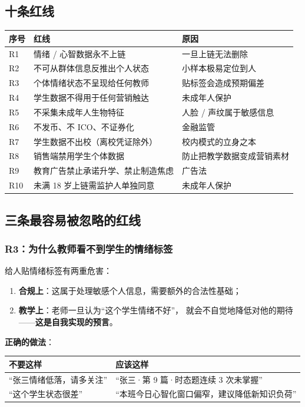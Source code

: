 \documentclass[UTF8,a4paper,11pt]{ctexart}
\newcommand{\hl}[1]{\textcolor{blue!70!black}{\textbf{#1}}}
\newcommand{\warn}[1]{\textcolor{red!70!black}{\textbf{#1}}}
\begin{document}
\subsection{十条红线}

\begin{longtable}{@{}p{1.0cm}p{6.6cm}p{6.0cm}@{}}
\toprule
\textbf{序号} & \textbf{红线} & \textbf{原因} \\
\midrule
R1 & 情绪 / 心智数据永不上链 & 一旦上链无法删除 \\
R2 & 不可从群体信息反推出个人状态 & 小样本极易定位到人 \\
R3 & 个体情绪状态不呈现给任何教师 & 贴标签会造成预期偏差 \\
R4 & 学生数据不得用于任何营销触达 & 未成年人保护 \\
R5 & 不采集未成年人生物特征 & 人脸 / 声纹属于敏感信息 \\
R6 & 不发币、不 ICO、不证券化 & 金融监管 \\
R7 & 学生数据不出校（离校凭证除外） & 校内模式的立身之本 \\
R8 & 销售端禁用学生个体数据 & 防止把教学数据变成营销素材 \\
R9 & 教育广告禁止承诺升学、禁止制造焦虑 & 广告法 \\
R10 & 未满 18 岁上链需监护人单独同意 & 未成年人保护 \\
\bottomrule
\end{longtable}

\subsection{三条最容易被忽略的红线}

\subsubsection{R3：为什么教师看不到学生的情绪标签}

给人贴情绪标签有两重危害：

\begin{enumerate}[leftmargin=1.8em]
\item \textbf{合规上}：这属于处理敏感个人信息，需要额外的合法性基础；
\item \textbf{教学上}：老师一旦认为“这个学生情绪不好”，
      就会不自觉地降低对他的期待——\hl{这是自我实现的预言}。
\end{enumerate}

\textbf{正确的做法}：

\begin{center}
\begin{tabular}{p{6.4cm}p{6.0cm}}
\toprule
\warn{不要这样} & \hl{应该这样} \\
\midrule
“张三情绪低落，请多关注” & “张三·第 9 篇·时态题连续 3 次未掌握” \\
“这个学生状态很差” & “本班今日心智化窗口偏窄，建议降低新知识负荷” \\
\bottomrule
\end{tabular}
\end{center}
\end{document}
